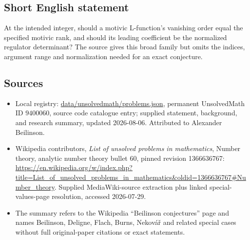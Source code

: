 \documentclass[11pt]{article}
\begin{document}
\subsection{Short English statement}
At the intended integer, should a motivic L-function's vanishing order equal the specified motivic rank, and should its leading coefficient be the normalized regulator determinant? The source gives this broad family but omits the indices, argument range and normalization needed for an exact conjecture.
\subsection{Sources}
\begin{itemize}
\item Local registry: \url{data/unsolvedmath/problems.json}, permanent UnsolvedMath ID \(9400060\), source code catalogue entry; supplied statement, background, and research summary, updated 2026-08-06. Attributed to Alexander Beilinson.
\item Wikipedia contributors, \emph{List of unsolved problems in mathematics}, Number theory, analytic number theory bullet 60, pinned revision 1366636767: \url{https://en.wikipedia.org/w/index.php?title=List_of_unsolved_problems_in_mathematics&oldid=1366636767#Number_theory}. Supplied MediaWiki-source extraction plus linked special-values-page resolution, accessed 2026-07-29.
\item The summary refers to the Wikipedia ``Beilinson conjectures'' page and names Beilinson, Deligne, Flach, Burns, Nekov\'a\v{r} and related special cases without full original-paper citations or exact statements.
\end{itemize}
\end{document}
